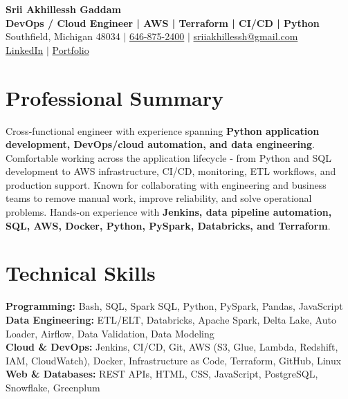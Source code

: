 \documentclass[letterpaper,10pt]{article}
\begin{document}
\fontsize{9.35pt}{10.45pt}\selectfont

\begin{center}
    {\LARGE \textbf{Srii Akhillessh Gaddam}} \\[-1pt]
    \textbf{DevOps / Cloud Engineer | AWS | Terraform | CI/CD | Python} \\[2pt]
    Southfield, Michigan 48034 $|$
    \href{tel:6468752400}{646-875-2400} $|$
    \href{mailto:sriiakhillessh@gmail.com}{sriiakhillessh@gmail.com} \\[1pt]
    \href{https://www.linkedin.com/in/srii-akhiilessh-gaddam-b48668191/}{LinkedIn} $|$
    \href{https://sriiakhillesshg.github.io/portfolio/}{Portfolio}
\end{center}
\vspace{-8pt}

\section{Professional Summary}
\small{Cross-functional engineer with experience spanning \textbf{Python application development, DevOps/cloud automation, and data engineering}. Comfortable working across the application lifecycle - from Python and SQL development to AWS infrastructure, CI/CD, monitoring, ETL workflows, and production support. Known for collaborating with engineering and business teams to remove manual work, improve reliability, and solve operational problems. Hands-on experience with \textbf{Jenkins, data pipeline automation, SQL, AWS, Docker, Python, PySpark, Databricks, and Terraform}.}

\section{Technical Skills}
\small{
\textbf{Programming:} Bash, SQL, Spark SQL, Python, PySpark, Pandas, JavaScript \\
\textbf{Data Engineering:} ETL/ELT, Databricks, Apache Spark, Delta Lake, Auto Loader, Airflow, Data Validation, Data Modeling \\
\textbf{Cloud \& DevOps:} Jenkins, CI/CD, Git, AWS (S3, Glue, Lambda, Redshift, IAM, CloudWatch), Docker, Infrastructure as Code, Terraform, GitHub, Linux \\
\textbf{Web \& Databases:} REST APIs, HTML, CSS, JavaScript, PostgreSQL, Snowflake, Greenplum
}
\end{document}

